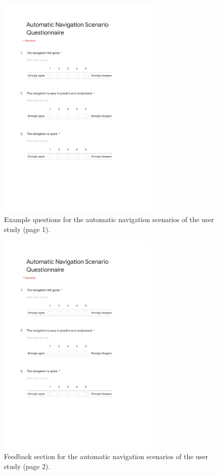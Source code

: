 \begin{figure}[h]
    \centering
    \includegraphics[width=0.7\textwidth]{content/appendix/docs/AutoNavScenarioQuestionnaire}
    \caption{Example questions for the automatic navigation scenarios of the user study (page 1).}
    \label{fig:study-autonav-questionnaire-1}
\end{figure}
\newpage

\begin{figure}[h]
    \centering
    \includegraphics[width=0.7\textwidth, page=2]{content/appendix/docs/AutoNavScenarioQuestionnaire}
    \caption{Feedback section for the automatic navigation scenarios of the user study (page 2).}
    \label{fig:study-autonav-questionnaire-2}
\end{figure}
